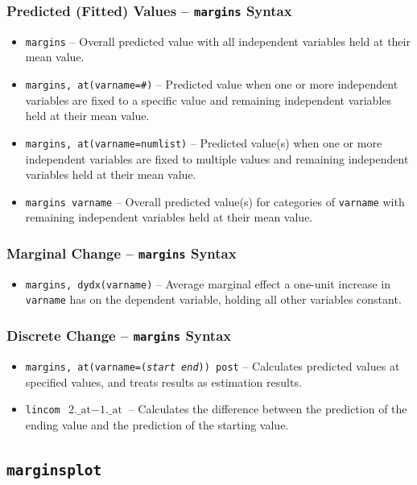\documentclass{beamer}
\begin{document}
\begin{frame}
	\frametitle{Predicted (Fitted) Values -- \texttt{margins} Syntax}
		\begin{itemize}
			\item \texttt{margins} -- Overall predicted value with all independent variables held at their mean value.
			\item \texttt{margins, at(varname=\#)} -- Predicted value when one or more independent variables are fixed to a specific value and remaining independent variables held at their mean value.
			\item \texttt{margins, at(varname=numlist)} -- Predicted value(s) when one or more independent variables are fixed to multiple values and remaining independent variables held at their mean value.
			\item \texttt{margins varname} -- Overall predicted value(s) for categories of \texttt{varname} with remaining independent variables held at their mean value.
		\end{itemize}
\end{frame}

\begin{frame}
	\frametitle{Marginal Change -- \texttt{margins} Syntax}
		\begin{itemize}
			\item \texttt{margins, dydx(varname)} -- Average marginal effect a one-unit increase in \texttt{varname} has on the dependent variable, holding all other variables constant.
		\end{itemize}
\end{frame}

\begin{frame}
	\frametitle{Discrete Change -- \texttt{margins} Syntax}
		\begin{itemize}
			\item \texttt{margins, at(varname=(\textit{start} \textit{end})) post} -- Calculates predicted values at specified values, and treats results as estimation results.
			\item \texttt{lincom $\mbox{2.\_at}-\mbox{1.\_at}$} -- Calculates the difference between the prediction of the ending value and the prediction of the starting value.
		\end{itemize}
\end{frame}

\subsection{\texttt{marginsplot}}
\end{document}

